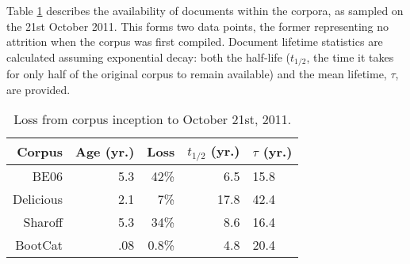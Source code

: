 Table \ref{table:longitudinal:attrition-inputdist} describes the availability of documents within the corpora, as sampled on the 21st October 2011.  This forms two data points, the former representing no attrition when the corpus was first compiled.  
Document lifetime statistics are calculated assuming exponential decay: both the half-life ($t_{1/2}$, the time it takes for only half of the original corpus to remain available) and the mean lifetime, $\tau$, are provided.








\begin{table}[h*tb]
    \centering
    \begin{tabular}{r | r | r | r | l}
	  Corpus & Age (yr.) & Loss & $t_{1/2}$ (yr.) & $\tau$ (yr.) \\
	\hline 
	
	BE06       & 5.3  & 42\%    & 6.5	& 15.8\\
	Delicious  & 2.1  & 7\%	    & 17.8 & 42.4\\
	Sharoff    & 5.3  & 34\%    & 8.6  & 16.4\\
	BootCat    & .08  & 0.8\%   & 4.8  & 20.4\\
    \end{tabular}

    \caption{Loss from corpus inception to October 21st, 2011.}
    \label{table:longitudinal:attrition-inputdist}
\end{table}

